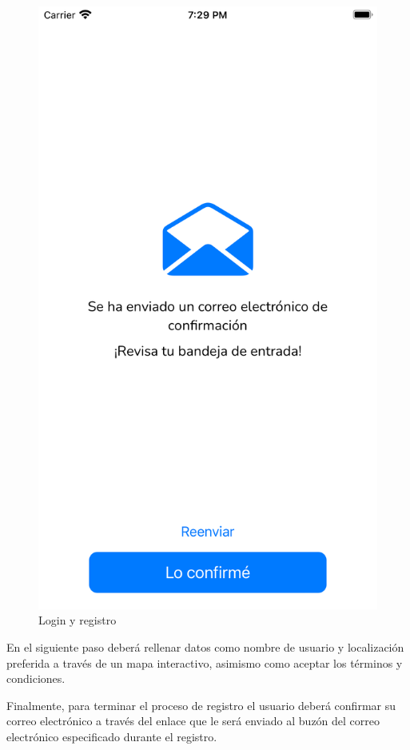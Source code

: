 \begin{appendices}
\begin{figure}[H]
\begin{minipage}{0.3\textwidth}
        \includegraphics[cframe=black 2pt, width=1\linewidth]{images/manual/registroConfirmacion.png}
    \end{minipage}
    \caption{Login y registro}
    \label{fig:login_register}
\end{figure}
En el siguiente paso deberá rellenar datos como nombre de usuario y localización preferida a través de un mapa interactivo, asimismo como aceptar los términos y condiciones.

Finalmente, para terminar el proceso de registro el usuario deberá confirmar su correo electrónico a través del enlace que le será enviado al buzón del correo electrónico especificado durante el registro.

\end{appendices}
